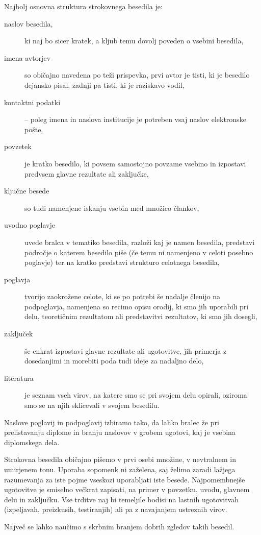 \documentclass[a4paper,12pt,openright]{book}
\begin{document}
Najbolj osnovna struktura strokovnega besedila je:
\begin{description}
\item[naslov besedila,] ki naj bo sicer kratek, a kljub temu dovolj poveden o vsebini besedila,
\item[imena avtorjev] so običajno navedena po teži prispevka, prvi avtor je tisti, ki je besedilo dejansko pisal, zadnji pa tisti, ki je raziskavo vodil,
\item[kontaktni podatki] -- poleg imena in naslova institucije je potreben vsaj naslov elektronske pošte,
\item[povzetek] je kratko besedilo, ki povsem samostojno povzame vsebino in izpostavi predvsem  glavne rezultate ali zaključke,
\item[ključne besede] so tudi namenjene iskanju vsebin med množico člankov,
\item[uvodno poglavje] uvede bralca v tematiko besedila, razloži kaj je namen besedila, predstavi področje o katerem besedilo piše 
(če temu ni namenjeno v celoti posebno poglavje) ter na kratko predstavi strukturo celotnega besedila,
\item[poglavja] tvorijo zaokrožene celote, ki se po potrebi še nadalje členijo na podpoglavja, namenjena so recimo opisu orodij, 
ki smo jih uporabili pri delu, teoretičnim rezultatom ali predstavitvi rezultatov, ki smo jih dosegli,
\item[zaključek] še enkrat izpostavi glavne rezultate ali ugotovitve, jih primerja z dosedanjimi in morebiti poda tudi ideje za nadaljno delo,
\item[literatura] je seznam vseh virov, na katere smo se pri svojem delu opirali, oziroma smo se na njih sklicevali v svojem besedilu.
\end{description}

Naslove poglavij in podpoglavij izbiramo tako, da lahko bralec že pri prelistavanju diplome in branju naslovov
v grobem ugotovi, kaj je vsebina diplomskega dela.

Strokovna besedila običajno pišemo v prvi osebi množine, v nevtralnem in umirjenem tonu. 
Uporaba sopomenk ni zaželena, saj želimo zaradi lažjega razumevanja za iste pojme vseskozi uporabljati iste besede.
Najpomembnejše ugotovitve je smiselno večkrat zapisati, na primer v povzetku, uvodu, glavnem delu in zaključku.
Vse trditve naj bi temeljile bodisi na lastnih ugotovitvah (izpeljavah, preizkusih, testiranjih) ali pa z navajanjem ustreznih virov.

Največ se lahko naučimo s skrbnim branjem dobrih zgledov takih besedil.
\end{document}
